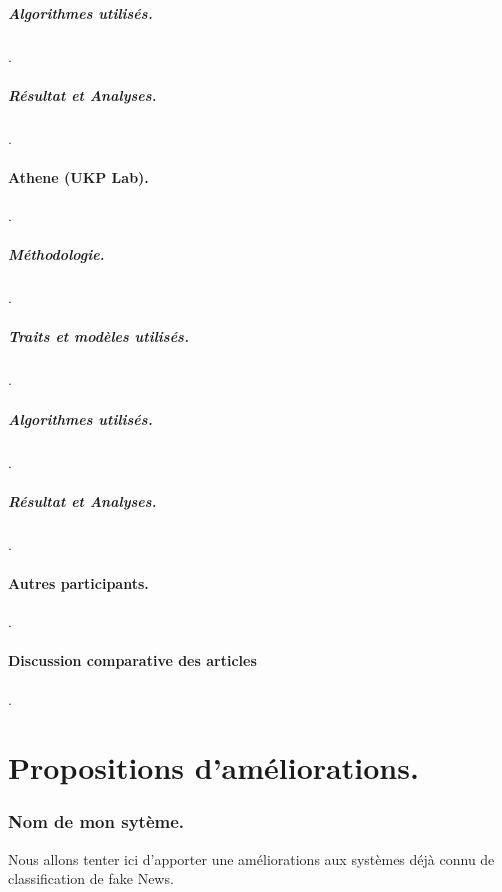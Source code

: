 \documentclass[onecolumn, 12pt]{article}
\begin{document}
    \subsubsection{Algorithmes utilisés.}
    .
    \subsubsection{Résultat et Analyses.}
    .
  \subsection{Athene (UKP Lab).}
    .
    \subsubsection{Méthodologie.}
    .
    \subsubsection{Traits et modèles utilisés.}
    .
    \subsubsection{Algorithmes utilisés.}
    .
    \subsubsection{Résultat et Analyses.}
    .
    \subsection{Autres participants.}
    .
    \subsection{Discussion comparative des articles}
    .


\part{Propositions d'améliorations.}
\section{Nom de mon sytème.}
Nous allons tenter ici d'apporter une améliorations aux systèmes déjà connu de
classification de fake News.
\end{document}
